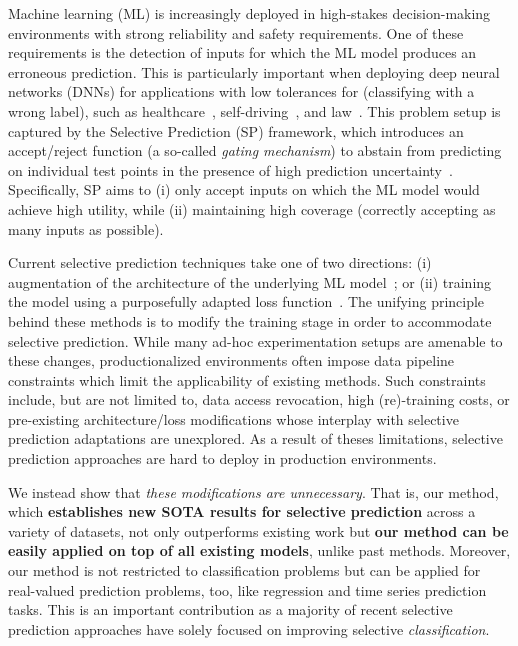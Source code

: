 Machine learning (ML) is increasingly deployed in high-stakes decision-making environments with strong reliability and safety requirements. One of these requirements is the detection of inputs for which the ML model produces an erroneous prediction. This is particularly important when deploying deep neural networks (DNNs) for applications with low tolerances for \fps (\ie classifying with a wrong label), such as healthcare~\citep{challen2019artificial, mozannar2020consistent}, self-driving~\citep{ghodsi2021generating}, and law~\citep{vieira2021understanding}.
This problem setup is captured by the Selective Prediction (SP) framework, which introduces an accept/reject function (a so-called \emph{gating mechanism}) to abstain from predicting on individual test points in the presence of high prediction uncertainty~\citep{geifman2017selective}. 
Specifically, SP aims to (i) only accept inputs on which the ML model would achieve high utility, while (ii) maintaining high coverage (\ie correctly accepting as many inputs as possible).

Current selective prediction techniques 
take one of two directions: (i) augmentation of the architecture of the underlying ML model~\citep{geifman2019selectivenet}; or (ii) training the model using a purposefully adapted loss function~\citep{liu2019deep, huang2020self, gangrade2021selective}. 
The unifying principle behind these methods is to modify the training stage in order to accommodate selective prediction. While many ad-hoc experimentation setups are amenable to these changes, productionalized environments often impose data pipeline constraints which limit the applicability of existing methods. Such constraints include, but are not limited to, data access revocation, high (re)-training costs, or pre-existing architecture/loss modifications whose interplay with selective prediction adaptations are unexplored. As a result of theses limitations, selective prediction approaches are hard to deploy in production environments.

We instead show that \textit{ these modifications are unnecessary}. That is, our method, which \textbf{establishes new SOTA results for selective prediction} across a variety of datasets, not only outperforms existing work but \textbf{our method can be easily applied on top of all existing models}, unlike past methods. Moreover, our method is not restricted to classification problems but can be applied for real-valued prediction problems, too, like regression and time series prediction tasks. This is an important contribution as a majority of recent selective prediction approaches have solely focused on improving selective \emph{classification}.

